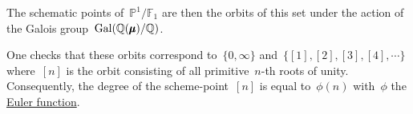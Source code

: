 The schematic points of~$\mathbb{P}^1/\mathbb{F}_1$ are then the orbits of this set under the action of the Galois group~$\operatorname{Gal}(\mathbb{Q}(\pmb{\mu})/\mathbb{Q})$.

One checks that these orbits correspond to~$\{ 0,\infty \}$ and~$\{ [1],[2],[3],[4],\cdots \}$ where~$[n]$ is the orbit consisting of all primitive~$n$-th roots of unity. Consequently, the degree of the scheme-point~$[n]$ is equal to~$\phi(n)$ with~$\phi$ the \href{http://en.wikipedia.org/wiki/Euler's_totient_function}{Euler function}.

